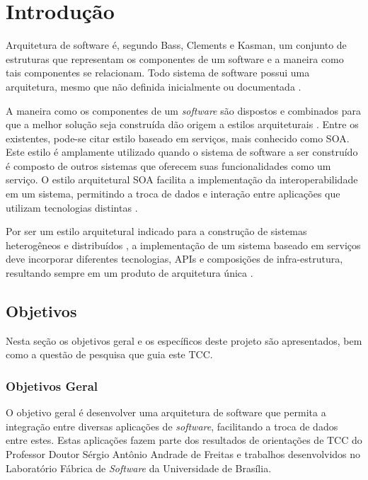 \chapter[Introdução]{Introdução}
Arquitetura de software é, segundo Bass, Clements e Kasman\cite{bass_software_archi_practice_2003}, um conjunto de estruturas que representam os componentes de um software e a maneira como tais componentes se relacionam. Todo sistema de software possui uma arquitetura, mesmo que não definida inicialmente ou documentada \cite{bass_software_archi_practice_2003}.

A maneira como os componentes de um \textit{software} são dispostos e combinados para que a melhor solução seja construída dão origem a estilos arquiteturais \cite{pressman2006engenharia}. Entre os existentes, pode-se citar estilo baseado em serviços, mais conhecido como SOA. Este estilo é amplamente utilizado quando o sistema de software a ser construído é composto de outros sistemas que oferecem suas funcionalidades como um serviço. O estilo arquitetural SOA facilita a implementação da interoperabilidade em um sistema, permitindo a troca de dados e interação entre aplicações que utilizam tecnologias distintas \cite{oqueesoa_2010}.

Por ser um estilo arquitetural indicado para a construção de sistemas heterogêneos e distribuídos \cite{josuttis_soa_2007}, a implementação de um sistema baseado em serviços deve incorporar diferentes tecnologias, APIs e composições de infra-estrutura, resultando sempre em um produto de arquitetura única \cite{erl_orientacaoaservico_2009}.

\section{Objetivos}

Nesta seção os objetivos geral e os específicos deste projeto são apresentados, bem como a questão de pesquisa que guia este TCC.

\subsection{Objetivos Geral}
O objetivo geral é desenvolver uma arquitetura de software que permita a integração entre diversas aplicações de \textit{software}, facilitando a troca de dados entre estes. Estas aplicações fazem parte dos resultados de orientações de TCC do Professor Doutor Sérgio Antônio Andrade de Freitas e trabalhos desenvolvidos no Laboratório Fábrica de \textit{Software} da Universidade de Brasília.

